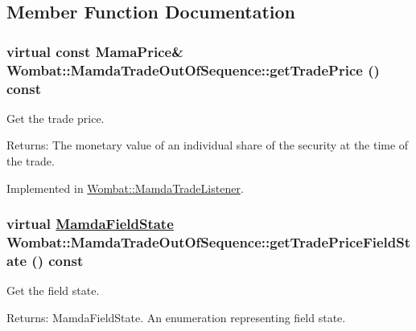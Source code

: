 \subsection{Member Function Documentation}
\hypertarget{classWombat_1_1MamdaTradeOutOfSequence_30fc1ebb7bdf21628684797d5dd7b9c0}{
\subsubsection[getTradePrice]{\setlength{\rightskip}{0pt plus 5cm}virtual const Mama\-Price\& Wombat::Mamda\-Trade\-Out\-Of\-Sequence::get\-Trade\-Price () const}}
\label{classWombat_1_1MamdaTradeOutOfSequence_30fc1ebb7bdf21628684797d5dd7b9c0}


Get the trade price. 

\begin{Desc}
\item[Returns:]The monetary value of an individual share of the security at the time of the trade. \end{Desc}


Implemented in \hyperlink{classWombat_1_1MamdaTradeListener_f2f5cd501bc1fcb6717a81c001004228}{Wombat::Mamda\-Trade\-Listener}.\hypertarget{classWombat_1_1MamdaTradeOutOfSequence_7ff7270f7dca5635214db31cd5c43ff6}{
\subsubsection[getTradePriceFieldState]{\setlength{\rightskip}{0pt plus 5cm}virtual \hyperlink{namespaceWombat_93aac974f2ab713554fd12a1fa3b7d2a}{Mamda\-Field\-State} Wombat::Mamda\-Trade\-Out\-Of\-Sequence::get\-Trade\-Price\-Field\-State () const}}
\label{classWombat_1_1MamdaTradeOutOfSequence_7ff7270f7dca5635214db31cd5c43ff6}


Get the field state. 

\begin{Desc}
\item[Returns:]Mamda\-Field\-State. An enumeration representing field state. \end{Desc}


